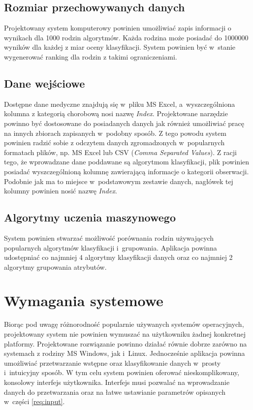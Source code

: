 \documentclass[../thesis.tex]{subfiles}
\begin{document}
\subsection{Rozmiar przechowywanych danych}

Projektowany system komputerowy powinien umożliwiać zapis informacji o wynikach dla 1000 rodzin algorytmów. Każda rodzina może posiadać do 1000000 wyników dla każdej z miar oceny klasyfikacji. System powinien być w~stanie wygenerować ranking dla rodzin z takimi ograniczeniami.

\subsection{Dane wejściowe}

Dostępne dane medyczne znajdują się w~pliku MS Excel, a~wyszczególniona kolumna z kategorią chorobową nosi nazwę \emph{Index}. Projektowane narzędzie powinno być dostosowane do posiadanych danych jak również umożliwiać pracę na innych zbiorach zapisanych w~podobny sposób. Z tego powodu system powinien radzić sobie z odczytem danych zgromadzonych w~popularnych formatach plików, np. MS Excel lub CSV (\textit{Comma Separated Values}). Z racji tego, że wprowadzane dane poddawane są algorytmom klasyfikacji, plik powinien posiadać wyszczególnioną kolumnę zawierającą informacje o kategorii obserwacji. Podobnie jak ma to miejsce w~podstawowym zestawie danych, nagłówek tej kolumny powinien nosić nazwę \textit{Index}.

\subsection{Algorytmy uczenia maszynowego}

System powinien stwarzać możliwość porównania rodzin używających popularnych algorytmów klasyfikacji i~grupowania. Aplikacja powinna udostępniać co najmniej 4 algorytmy klasyfikacji danych oraz co najmniej 2 algorytmy grupowania atrybutów.

\section{Wymagania systemowe}

Biorąc pod uwagę różnorodność popularnie używanych systemów operacyjnych, projektowany system nie powinien wymuszać na użytkowniku żadnej konkretnej platformy. Projektowane rozwiązanie powinno działać równie dobrze zarówno na systemach z rodziny MS Windows, jak i~Linux. Jednocześnie aplikacja powinna umożliwiać przetwarzanie wstępne oraz klasyfikowanie danych w~prosty i~intuicyjny sposób. W tym celu system powinien oferować nieskomplikowany, konsolowy interfejs użytkownika. Interfejs musi pozwalać na wprowadzanie danych do przetwarzania oraz na łatwe ustawianie parametrów opisanych w~części \ref{req:input}.
\end{document}
